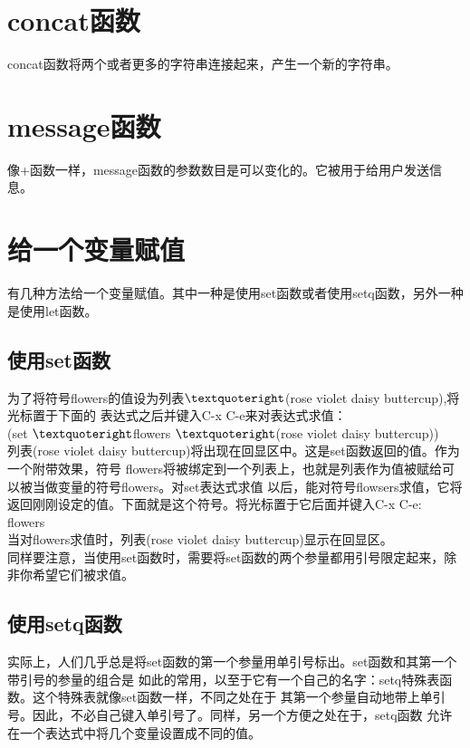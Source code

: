 \section{concat函数}
concat函数将两个或者更多的字符串连接起来，产生一个新的字符串。

\section{message函数}
像+函数一样，message函数的参数数目是可以变化的。它被用于给用户发送信息。

\section{给一个变量赋值}
有几种方法给一个变量赋值。其中一种是使用set函数或者使用setq函数，另外一种是使用let函数。

\subsection{使用set函数}
为了将符号flowers的值设为列表$\textquoteright$(rose violet daisy buttercup),将光标置于下面的
表达式之后并键入C-x C-e来对表达式求值：\\
(set $\textquoteright$flowers $\textquoteright$(rose violet daisy buttercup))\\
列表(rose violet daisy buttercup)将出现在回显区中。这是set函数返回的值。作为一个附带效果，符号
flowers将被绑定到一个列表上，也就是列表作为值被赋给可以被当做变量的符号flowers。对set表达式求值
以后，能对符号flowsers求值，它将返回刚刚设定的值。下面就是这个符号。将光标置于它后面并键入C-x C-e:\\
flowers\\
当对flowers求值时，列表(rose violet daisy buttercup)显示在回显区。\\
同样要注意，当使用set函数时，需要将set函数的两个参量都用引号限定起来，除非你希望它们被求值。

\subsection{使用setq函数}
实际上，人们几乎总是将set函数的第一个参量用单引号标出。set函数和其第一个带引号的参量的组合是
如此的常用，以至于它有一个自己的名字：setq特殊表函数。这个特殊表就像set函数一样，不同之处在于
其第一个参量自动地带上单引号。因此，不必自己键入单引号了。同样，另一个方便之处在于，setq函数
允许在一个表达式中将几个变量设置成不同的值。



